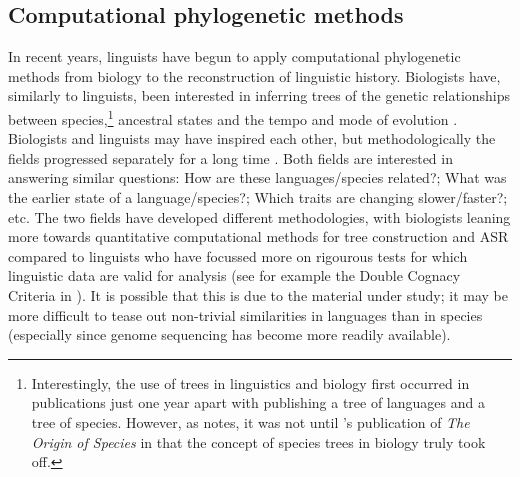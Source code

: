\documentclass[12pt,letterpaper]{article}
\begin{document}
\subsection{Computational phylogenetic methods}
\label{sec:asr_methods}
In recent years, linguists have begun to apply computational phylogenetic methods from biology to the reconstruction of linguistic history. Biologists have, similarly to linguists, been interested in inferring trees of the genetic relationships between species,\footnote{Interestingly, the use of trees in linguistics and biology first occurred in publications just one year apart with \citet{schlegel1808sprache} publishing a tree of languages and \citet{lamarck1809philosophie} a tree of species. However, as \citet[370]{greenhill2015evolution} notes, it was not until \citeauthor{darwin1859origin}'s publication of \textit{The Origin of Species} in \citeyear{darwin1859origin} that the concept of species trees in biology truly took off.} ancestral states and the tempo and mode of evolution \citep{atkinson2005curious}. Biologists and linguists may have inspired each other, but methodologically the fields progressed separately for a long time \citep[370]{greenhill2015evolution}. Both fields are interested in answering similar questions: How are these languages/species related?; What was the earlier state of a language/species?; Which traits are changing slower/faster?; etc. The two fields have developed different methodologies, with biologists leaning more towards quantitative computational methods for tree construction and ASR compared to linguists who have focussed more on rigourous tests for which linguistic data are valid for analysis (see for example the Double Cognacy Criteria in \citealt{walkden_2013}). It is possible that this is due to the material under study; it may be more difficult to tease out non-trivial similarities in languages than in species (especially since genome sequencing has become more readily available).

\end{document}
